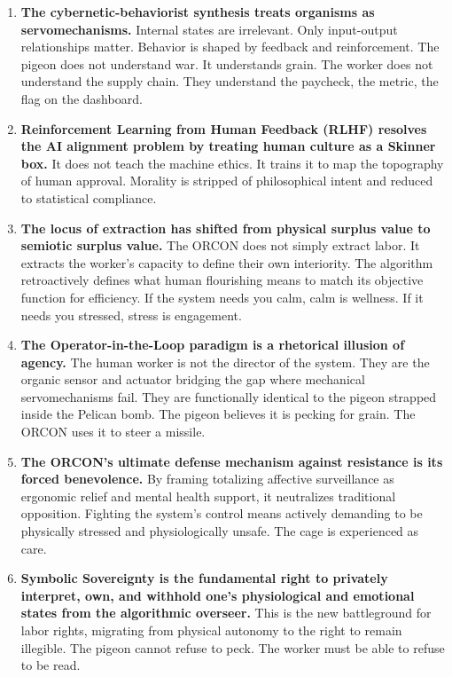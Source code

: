 \documentclass[runningheads]{llncs}
\begin{document}
\begin{enumerate}
    \item \textbf{The cybernetic-behaviorist synthesis treats organisms as servomechanisms.} Internal states are irrelevant. Only input-output relationships matter. Behavior is shaped by feedback and reinforcement. The pigeon does not understand war. It understands grain. The worker does not understand the supply chain. They understand the paycheck, the metric, the flag on the dashboard.

    \item \textbf{Reinforcement Learning from Human Feedback (RLHF) resolves the AI alignment problem by treating human culture as a Skinner box.} It does not teach the machine ethics. It trains it to map the topography of human approval. Morality is stripped of philosophical intent and reduced to statistical compliance. 

    \item \textbf{The locus of extraction has shifted from physical surplus value to semiotic surplus value.} The ORCON does not simply extract labor. It extracts the worker's capacity to define their own interiority. The algorithm retroactively defines what human flourishing means to match its objective function for efficiency. If the system needs you calm, calm is wellness. If it needs you stressed, stress is engagement.

    \item \textbf{The Operator-in-the-Loop paradigm is a rhetorical illusion of agency.} The human worker is not the director of the system. They are the organic sensor and actuator bridging the gap where mechanical servomechanisms fail. They are functionally identical to the pigeon strapped inside the Pelican bomb. The pigeon believes it is pecking for grain. The ORCON uses it to steer a missile.

    \item \textbf{The ORCON's ultimate defense mechanism against resistance is its forced benevolence.} By framing totalizing affective surveillance as ergonomic relief and mental health support, it neutralizes traditional opposition. Fighting the system's control means actively demanding to be physically stressed and physiologically unsafe. The cage is experienced as care.

    \item \textbf{Symbolic Sovereignty is the fundamental right to privately interpret, own, and withhold one's physiological and emotional states from the algorithmic overseer.} This is the new battleground for labor rights, migrating from physical autonomy to the right to remain illegible. The pigeon cannot refuse to peck. The worker must be able to refuse to be read.
\end{enumerate}
\end{document}
